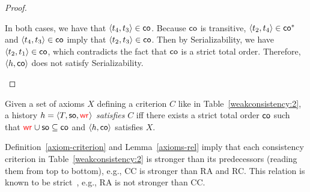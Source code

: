 \begin{proof}
\begin{itemize}
In both cases, we have that ${\left\langle{{t}_4, {t}_3}\right\rangle} \in \mathsf{co}$. Because $\mathsf{co}$ is transitive, ${\left\langle{{t}_2, {t}_4}\right\rangle} \in \mathsf{co}^*$ and ${\left\langle{{t}_4, {t}_3}\right\rangle} \in \mathsf{co}$ imply that ${\left\langle{{t}_2, {t}_3}\right\rangle} \in \mathsf{co}$. Then by \textsf{Serializability}, we have ${\left\langle{{t}_2, {t}_1}\right\rangle} \in \mathsf{co}$, which contradicts the fact that $\mathsf{co}$ is a strict total order. Therefore, ${\left\langle{{h}, \mathsf{co}}\right\rangle}$ does not satisfy \textsf{Serializability}.
 \end{itemize}
\end{proof}


\begin{definition}
 Given a set of axioms $X$ defining a criterion $C$ like in Table~\ref{weakconsistency:2}, a history ${h}={\left\langle{T, \mathsf{so}, \textcolor{red}{\mathsf{wr}_{}}}\right\rangle}$ \emph{satisfies} $C$ iff there exists a strict total order $\mathsf{co}$ such that $\textcolor{red}{\mathsf{wr}_{}}\cup\mathsf{so}\subseteq \mathsf{co}$ and ${\left\langle{h,\mathsf{co}}\right\rangle}$ satisfies $X$.
 \label{axiom-criterion}
\end{definition}

Definition~\ref{axiom-criterion} and Lemma~\ref{axioms-rel} imply that each consistency criterion in Table~\ref{weakconsistency:2} is stronger than its predecessors (reading them from top to bottom), e.g., CC is stronger than RA and RC. This relation is known to be strict~\cite{DBLP:conf/concur/Cerone0G15}, e.g., RA is not stronger than CC. 


